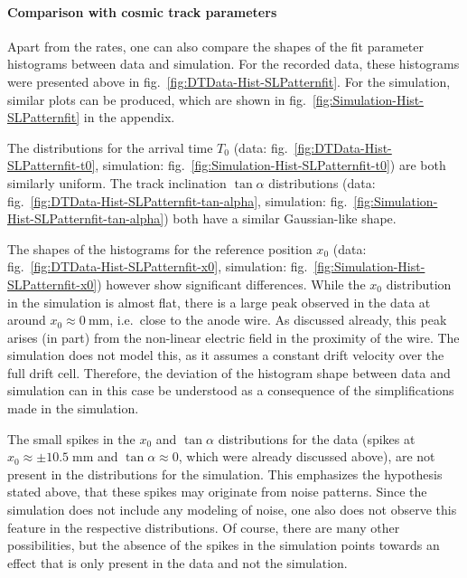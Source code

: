 \paragraph{Comparison with cosmic track parameters}
Apart from the rates, one can also compare the shapes of the fit parameter histograms between data and simulation. For the recorded data, these histograms were presented above in fig.\ \ref{fig:DTData-Hist-SLPatternfit}. For the simulation, similar plots can be produced, which are shown in fig.\ \ref{fig:Simulation-Hist-SLPatternfit} in the appendix.
\par The distributions for the arrival time $T_0$ (data: fig.\ \ref{fig:DTData-Hist-SLPatternfit-t0}, simulation: fig.\ \ref{fig:Simulation-Hist-SLPatternfit-t0}) are both similarly uniform. The track inclination $\tan\alpha$ distributions (data: fig.\ \ref{fig:DTData-Hist-SLPatternfit-tan-alpha}, simulation: fig.\ \ref{fig:Simulation-Hist-SLPatternfit-tan-alpha}) both have a similar Gaussian-like shape.
\par The shapes of the histograms for the reference position $x_0$ (data: fig.\ \ref{fig:DTData-Hist-SLPatternfit-x0}, simulation: fig.\ \ref{fig:Simulation-Hist-SLPatternfit-x0}) however show significant differences. While the $x_0$ distribution in the simulation is almost flat, there is a large peak observed in the data at around $x_0\approx\SI{0}{\mm}$, i.e.\ close to the anode wire. As discussed already, this peak arises (in part) from the non-linear electric field in the proximity of the wire. The simulation does not model this, as it assumes a constant drift velocity over the full drift cell. Therefore, the deviation of the histogram shape between data and simulation can in this case be understood as a consequence of the simplifications made in the simulation.
\par The small spikes in the $x_0$ and $\tan\alpha$ distributions for the data (spikes at $x_0\approx\pm 10.5\;\si{\mm}$ and $\tan\alpha\approx 0$, which were already discussed above), are not present in the distributions for the simulation. This emphasizes the hypothesis stated above, that these spikes may originate from noise patterns. Since the simulation does not include any modeling of noise, one also does not observe this feature in the respective distributions. Of course, there are many other possibilities, but the absence of the spikes in the simulation points towards an effect that is only present in the data and not the simulation.





